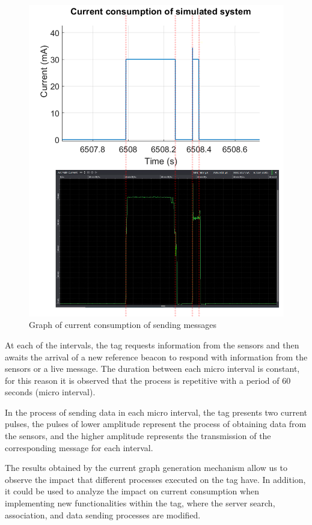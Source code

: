 \documentclass[journal]{IEEEtran}	%
\begin{document}
\begin{figure}[t]
\centering
\includegraphics[width=0.99\columnwidth]{microIntervalsOne.png}
\caption{Graph of current consumption of sending messages}
\label{fig:sendMessage}
\end{figure}

At each of the intervals, the tag requests information from the sensors and then awaits the arrival of a new reference beacon to respond with information from the sensors or a live message. The duration between each micro interval is constant, for this reason it is observed that the process is repetitive with a period of 60 seconds (micro interval).

In the process of sending data in each micro interval, the tag presents two current pulses, the pulses of lower amplitude represent the process of obtaining data from the sensors, and the higher amplitude represents the transmission of the corresponding message for each interval.

The results obtained by the current graph generation mechanism allow us to observe the impact that different processes executed on the tag have. In addition, it could be used to analyze the impact on current consumption when implementing new functionalities within the tag, where the server search, association, and data sending processes are modified.
\end{document}
